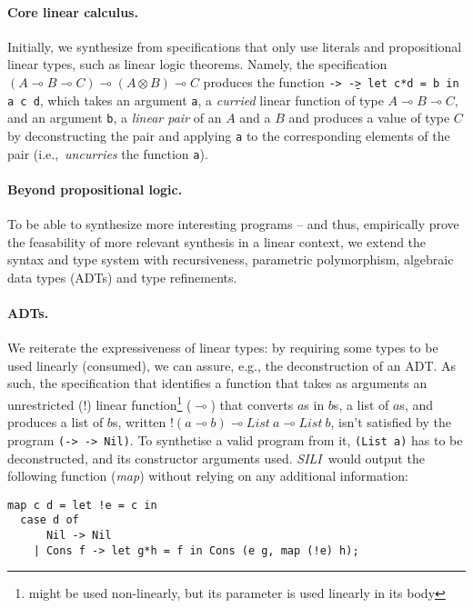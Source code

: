 \documentclass{llncs}
\newcommand{\lolli}{\multimap}
\newcommand{\tensor}{\otimes}
\newcommand{\bang}{{!}}
\newcommand{\synname}{\emph{SILI}}
\begin{document}
\paragraph{Core linear calculus.} Initially, we synthesize from
specifications that only use literals and propositional linear types, such as linear logic theorems. Namely,
the specification $(A \lolli B \lolli C) \lolli (A \tensor B) \lolli C$ produces
the function \texttt{\a -> \b -> let c*d = b in a c d},
which takes an argument \texttt{a}, a
\emph{curried} linear function of type $A \lolli B \lolli C$,  and an
argument \texttt{b}, a \emph{linear
  pair} of an $A$ and a $B$ and produces a value of type $C$ by
deconstructing the pair and applying \texttt{a} to the
corresponding elements of the pair (i.e.,~\emph{uncurries} the
function \texttt{a}).


\paragraph{Beyond propositional logic.} To be able to synthesize more
interesting programs -- and thus, empirically prove the feasability of
more relevant synthesis in a linear context, we extend the syntax and
type system with recursiveness, parametric polymorphism, algebraic
data types (ADTs) and type refinements.


\paragraph{ADTs.} We reiterate the expressiveness of linear types: by requiring
some types to be used linearly (consumed), we can assure, e.g., the
deconstruction of an ADT. As such, the specification that identifies a function
that takes as arguments an unrestricted ($\bang$) linear function\footnote{might be used non-linearly, but its parameter is used
linearly in its body} 
($\lolli$) that converts $a$s in $b$s, a list of $a$s, and produces a
list of $b$s, written $\bang(a \lolli b) \lolli List\ a \lolli List\ b$, isn't
satisfied by the program \texttt{(\x -> \y -> Nil)}. To synthetise
a valid program from it, \texttt{(List a)} has to be deconstructed,
and its constructor arguments used. \synname\ would output the following
function (\emph{map}) without relying on any additional information:
%
%
\begin{verbatim}
map c d = let !e = c in
  case d of
      Nil -> Nil
    | Cons f -> let g*h = f in Cons (e g, map (!e) h);
\end{verbatim}
\end{document}
